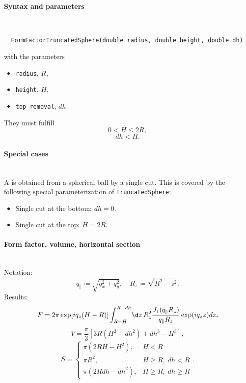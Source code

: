 \paragraph{Syntax and parameters}\strut\\[-2ex plus .2ex minus .2ex]
\begin{lstlisting}
  FormFactorTruncatedSphere(double radius, double height, double dh)
\end{lstlisting}
with the parameters
\begin{itemize}
\item \texttt{radius}, $R$,
\item \texttt{height}, $H$,
\item \texttt{top removal}, $dh$.
\end{itemize}
They must fulfill
\begin{equation*}
   0 < H\leq 2R,
\end{equation*}
\begin{equation*}
  dh < H.
\end{equation*}

\paragraph{Special cases}\strut\\
%
%
A  is obtained from a spherical ball by a single cut.
This is covered by the following special parameterization of \texttt{TruncatedSphere}:
\begin{itemize}
\item Single cut at the bottom: $dh=0$.
\item Single cut at the top: $H=2R$.
\end{itemize}

\paragraph{Form factor, volume, horizontal section}\strut\\
Notation:
\begin{equation*}
  q_{\parallel} \coloneqq \sqrt{q_x^2+q_y^2},\quad
  R_z \coloneqq \sqrt{R^2-z^2}.
\end{equation*}
Results:
\begin{equation*}
F= 2\pi \exp[i q_z (H-R)]\int_{R-H}^{R-dh}\!\d z\, R_z^2
       \frac{J_1(q_{\parallel} R_z) }{q_{\parallel} R_z} \exp(i q_z z) dz,
\end{equation*}
\begin{equation*}
  V=\frac{\pi}{3} \left[ 3R\left(H^2-dh^2\right) +dh^3 - H^3 \right],
\end{equation*}
\begin{equation*}
  S = \left\{\begin{array}{ll} \pi\left(2RH-H^2\right), & H < R \\
                               \pi R^2, & H \geq R,\; dh < R \\
                               \pi\left(2Rdh-dh^2\right), & H \geq R,\; dh \geq R
                                 \end{array}\right..
\end{equation*}

